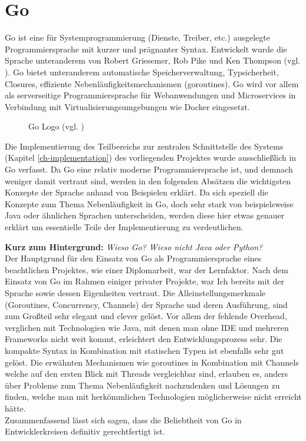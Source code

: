 \section{Go}\label{sec:tech:go}
Go ist eine für Systemprogrammierung (Dienste, Treiber, etc.) ausgelegte Programmiersprache mit kurzer und prägnanter Syntax. Entwickelt wurde die Sprache unteranderem von Robert Griesemer, Rob Pike und Ken Thompson (vgl. \cite{go:wiki}). Go bietet unteranderem automatische Speicherverwaltung, Typsicherheit, Closures, effiziente Nebenläufigkeitsmechanismen (goroutines). Go wird vor allem als serverseitige Programmiersprache für Webanwendungen und Microservices in Verbindung mit Virtualisierungsumgebungen wie Docker  eingesetzt.
\begin{figure}
    \centering
    
    \caption{Go Logo (vgl. \cite{GoLogoBlue})}
\end{figure}
Die Implementierung des Teilbereichs zur zentralen Schnittstelle des Systems (Kapitel \ref{ch-implementation}) des vorliegenden Projektes wurde ausschließlich in Go verfasst. Da Go eine relativ moderne Programmiersprache ist, und demnach weniger damit vertraut sind, werden in den folgenden Absätzen die wichtigsten Konzepte der Sprache anhand von Beispielen erklärt. Da sich speziell die Konzepte zum Thema Nebenläufigkeit in Go, doch sehr stark von beispielsweise Java oder ähnlichen Sprachen unterscheiden, werden diese hier etwas genauer erklärt um essentielle Teile der Implementierung zu verdeutlichen.\bigskip

\noindent
\textbf{Kurz zum Hintergrund:} \textit{Wieso Go? Wieso nicht Java oder Python?}\\
Der Hauptgrund für den Einsatz von Go als Programmiersprache eines beachtlichen Projektes, wie einer Diplomarbeit, war der Lernfaktor. Nach dem Einsatz von Go im Rahmen einiger privater Projekte, war Ich bereits mit der Sprache sowie dessen Eigenheiten vertraut. Die Alleinstellungsmerkmale (Goroutines, Concurrency, Channels) der Sprache und deren Ausführung, sind zum Großteil sehr elegant und clever gelöst. Vor allem der fehlende Overhead, verglichen mit Technologien wie Java, mit denen man ohne IDE und mehreren Frameworks nicht weit kommt, erleichtert den Entwicklungsprozess sehr. Die kompakte Syntax in Kombination mit statischen Typen ist ebenfalls sehr gut gelöst. Die erwähnten Mechanismen wie goroutines in Kombination mit Channels welche auf den ersten Blick mit Threads vergleichbar sind, erlauben es, anders über Probleme zum Thema Nebenläufigkeit nachzudenken und Lösungen zu finden, welche man mit herkömmlichen Technologien möglicherweise nicht erreicht hätte.\\
Zusammenfassend lässt sich sagen, dass die Beliebtheit von Go in Entwicklerkreisen definitiv gerechtfertigt ist.\bigskip 

